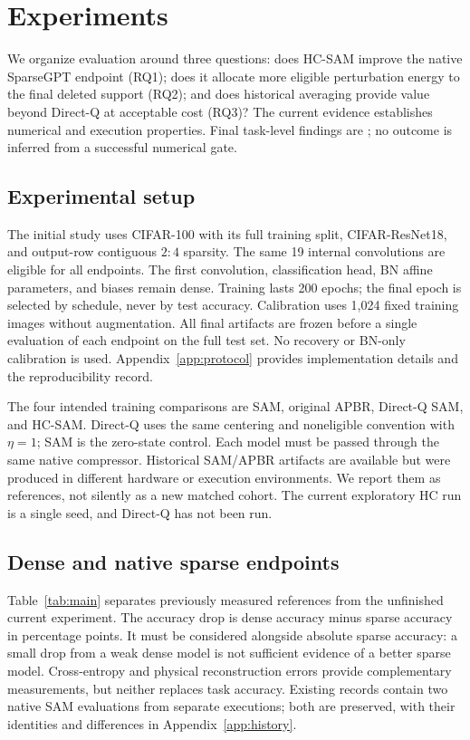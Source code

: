\section{Experiments}
\label{sec:experiments}
We organize evaluation around three questions: does HC-SAM improve the native SparseGPT endpoint (RQ1); does it allocate more eligible perturbation energy to the final deleted support (RQ2); and does historical averaging provide value beyond Direct-Q at acceptable cost (RQ3)? The current evidence establishes numerical and execution properties. Final task-level findings are \pending; no outcome is inferred from a successful numerical gate.

\subsection{Experimental setup}
The initial study uses CIFAR-100 with its full training split, CIFAR-ResNet18, and output-row contiguous $2{:}4$ sparsity. The same 19 internal convolutions are eligible for all endpoints. The first convolution, classification head, BN affine parameters, and biases remain dense. Training lasts 200 epochs; the final epoch is selected by schedule, never by test accuracy. Calibration uses 1,024 fixed training images without augmentation. All final artifacts are frozen before a single evaluation of each endpoint on the full test set. No recovery or BN-only calibration is used. Appendix~\ref{app:protocol} provides implementation details and the reproducibility record.

The four intended training comparisons are SAM, original APBR, Direct-Q SAM, and HC-SAM. Direct-Q uses the same centering and noneligible convention with $\eta=1$; SAM is the zero-state control. Each model must be passed through the same native compressor. Historical SAM/APBR artifacts are available but were produced in different hardware or execution environments. We report them as references, not silently as a new matched cohort. The current exploratory HC run is a single seed, and Direct-Q has not been run.

\subsection{Dense and native sparse endpoints}
\MainResultsTable
Table~\ref{tab:main} separates previously measured references from the unfinished current experiment. The accuracy drop is dense accuracy minus sparse accuracy in percentage points. It must be considered alongside absolute sparse accuracy: a small drop from a weak dense model is not sufficient evidence of a better sparse model. Cross-entropy and physical reconstruction errors provide complementary measurements, but neither replaces task accuracy. Existing records contain two native SAM evaluations from separate executions; both are preserved, with their identities and differences in Appendix~\ref{app:history}.

